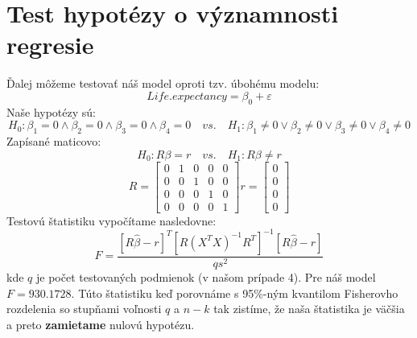 \section*{Test hypotézy o významnosti regresie}
Ďalej môžeme testovať náš model oproti tzv. úbohému modelu:
\[
    Life.expectancy = \beta_0 + \varepsilon
\]
Naše hypotézy sú:
\[
H_0: \beta_1=0\land\beta_2=0\land\beta_3=0\land\beta_4=0 \quad vs. \quad H_1: \beta_1\ne0\lor\beta_2\ne0\lor\beta_3\ne0\lor\beta_4\ne0
\]
Zapísané maticovo:
\[
    H_0: R\beta = r \quad vs. \quad H_1: R\beta \ne r
\]
\[
    R = \begin{bmatrix}
        0 & 1 & 0 & 0 & 0\\
        0 & 0 & 1 & 0 & 0\\
        0 & 0 & 0 & 1 & 0\\
        0 & 0 & 0 & 0 & 1
        \end{bmatrix}
    r = \begin{bmatrix}
        0 \\
        0 \\
        0 \\
        0 
        \end{bmatrix}
\]
Testovú štatistiku vypočítame nasledovne:
\[
    F = \frac{[R\hat{\beta}-r]^T[R(X^TX)^{-1}R^T]^{-1}[R\hat{\beta}-r]}{qs^2}
\]
kde $q$ je počet testovaných podmienok (v našom prípade 4). Pre náš model $F=930.1728$.
Túto štatistiku keď porovnáme s 95\%-ným kvantilom Fisherovho rozdelenia so stupňami voľnosti $q$ a $n-k$ tak zistíme,
že naša štatistika je väčšia a preto \textbf{zamietame} nulovú hypotézu.

